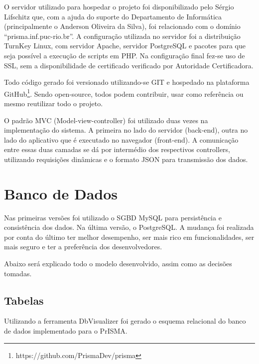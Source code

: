 \documentclass[graduacao,brazil]{ThesisPUC}
\begin{document}
O servidor utilizado para hospedar o projeto foi disponibilizado pelo Sérgio Lifschitz que, com a ajuda do suporte do Departamento de Informática (principalmente o Anderson Oliveira da Silva), foi relacionado com o domínio “prisma.inf.puc-rio.br”. A configuração utilizada no servidor foi a distribuição TurnKey Linux, com servidor Apache\cite{Apache}, servidor PostgreSQL\cite{PostgreSQL} e pacotes para que seja possível a execução de scripts em PHP\cite{PHP}. Na configuração final fez-se uso de SSL, sem a disponibilidade de certificado verificado por Autoridade Certificadora.

Todo código gerado foi versionado utilizando-se GIT e hospedado na plataforma GitHub\footnote{https://github.com/PrismaDev/prisma}. Sendo open-source, todos podem contribuir, usar como referência ou mesmo reutilizar todo o projeto.

O padrão MVC (Model-view-controller) foi utilizado duas vezes na implementação do sistema. A primeira no lado do servidor (back-end), outra no lado do aplicativo que é executado no navegador (front-end). A comunicação entre essas duas camadas se dá por intermédio dos respectivos controllers, utilizando requisições dinâmicas e o formato JSON para transmissão dos dados.

\section{Banco de Dados}

Nas primeiras versões foi utilizado o SGBD MySQL para persistência e consistência dos dados. Na última versão, o PostgreSQL. A mudança foi realizada por conta do último ter melhor desempenho, ser mais rico em funcionalidades, ser mais seguro e ter a preferência dos desenvolvedores.

Abaixo será explicado todo o modelo desenvolvido, assim como as decisões tomadas.

\subsection{Tabelas}

Utilizando a ferramenta DbVisualizer\cite{DbVisualizer} foi gerado o esquema relacional do banco de dados implementado para o PrISMA.
\end{document}
